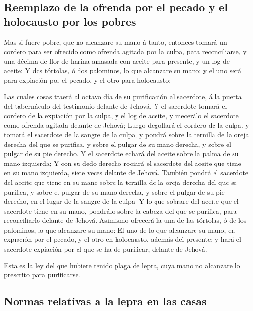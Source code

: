 \hypertarget{reemplazo-de-la-ofrenda-por-el-pecado-y-el-holocausto-por-los-pobres}{%
\subsection{Reemplazo de la ofrenda por el pecado y el holocausto por
los
pobres}\label{reemplazo-de-la-ofrenda-por-el-pecado-y-el-holocausto-por-los-pobres}}

 Mas si fuere pobre, que no alcanzare su mano á tanto,
entonces tomará un cordero para ser ofrecido como ofrenda agitada por la
culpa, para reconciliarse, y una décima de flor de harina amasada con
aceite para presente, y un log de aceite;  Y dos
tórtolas, ó dos palominos, lo que alcanzare su mano: y el uno será para
expiación por el pecado, y el otro para holocausto;

 Las cuales cosas traerá al octavo día de su purificación
al sacerdote, á la puerta del tabernáculo del testimonio delante de
Jehová.  Y el sacerdote tomará el cordero de la expiación
por la culpa, y el log de aceite, y mecerálo el sacerdote como ofrenda
agitada delante de Jehová;  Luego degollará el cordero de
la culpa, y tomará el sacerdote de la sangre de la culpa, y pondrá sobre
la ternilla de la oreja derecha del que se purifica, y sobre el pulgar
de su mano derecha, y sobre el pulgar de su pie derecho. 
Y el sacerdote echará del aceite sobre la palma de su mano izquierda;
 Y con su dedo derecho rociará el sacerdote del aceite
que tiene en su mano izquierda, siete veces delante de Jehová.
 También pondrá el sacerdote del aceite que tiene en su
mano sobre la ternilla de la oreja derecha del que se purifica, y sobre
el pulgar de su mano derecha, y sobre el pulgar de su pie derecho, en el
lugar de la sangre de la culpa.  Y lo que sobrare del
aceite que el sacerdote tiene en su mano, pondrálo sobre la cabeza del
que se purifica, para reconciliarlo delante de Jehová. 
Asimismo ofrecerá la una de las tórtolas, ó de los palominos, lo que
alcanzare su mano:  El uno de lo que alcanzare su mano,
en expiación por el pecado, y el otro en holocausto, además del
presente: y hará el sacerdote expiación por el que se ha de purificar,
delante de Jehová.

 Esta es la ley del que hubiere tenido plaga de lepra,
cuya mano no alcanzare lo prescrito para purificarse.

\hypertarget{normas-relativas-a-la-lepra-en-las-casas}{%
\subsection{Normas relativas a la lepra en las
casas}\label{normas-relativas-a-la-lepra-en-las-casas}}

